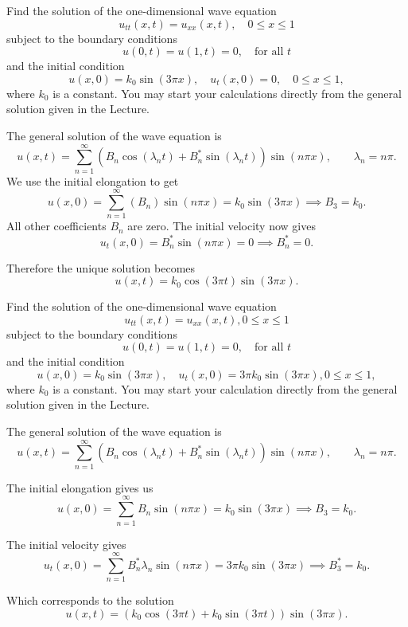 Find the solution of the one-dimensional wave equation
\[ 
u_{tt} (x,t) = u_{x x} (x,t), \quad 0 \leq x \leq 1
\]
subject to the boundary conditions
\[ 
u(0,t) = u(1,t) = 0, \quad \text{for all } t
\]
and the initial condition
\[ 
u(x,0) = k_0 \sin \left( 3 \pi x \right), \quad u_t(x,0) = 0, \quad 0 \leq x\leq 1,
\]
where $k_0$ is a constant.
You may start your calculations directly from the general solution given in the Lecture.

\hr

The general solution of the wave equation is
\[ 
u(x,t) = \sum_{n = 1}^{\infty} \left( B_n \cos \left( \lambda_n t \right) + B_n^{*} \sin \left( \lambda_n t \right) \right) \sin \left( n \pi x \right), \qquad \lambda_n = n \pi
.\]
We use the initial elongation to get
\[ 
u(x,0) = \sum_{n = 1}^{\infty} \left( B_n \right) \sin \left( n \pi x \right) = k_0 \sin (3 \pi x) \implies B_3 = k_0
.\]
All other coefficients $B_n$ are zero.
The initial velocity now gives
\[ 
u_t (x,0) = B_n^{*} \sin \left( n \pi x \right) = 0 \implies B_n^{*} = 0
.\]

Therefore the unique solution becomes
\[ 
  u (x,t) = k_0 \cos \left( 3 \pi t \right) \sin \left( 3 \pi x \right)
.\]


Find the solution of the one-dimensional wave equation
\[ 
u_{tt} (x,t) = u_{xx}(x,t), 0 \leq x \leq 1
\]
subject to the boundary conditions
\[ 
u(0,t) = u(1,t) = 0, \quad \text{for all } t
\]
and the initial condition
\[ 
u(x,0) = k_0 \sin \left( 3 \pi x \right), \quad u_t (x,0) = 3\pi k_0 \sin \left( 3 \pi x \right), 0 \leq x \leq 1,
\]
where $k_0$ is a constant.
You may start your calculation directly from the general solution given in the Lecture.

\hr

The general solution of the wave equation is
\[ 
u(x,t) = \sum_{n = 1}^{\infty} \left( B_n \cos \left( \lambda_n t \right) + B_n^{*} \sin \left( \lambda_n t \right) \right) \sin \left( n \pi x \right), \qquad \lambda_n = n \pi
.\]

The initial elongation gives us
\[ 
u (x,0) = \sum_{n = 1}^{\infty} B_n \sin (n \pi x) = k_0 \sin (3 \pi x) \implies B_3 = k_0
.\]

The initial velocity gives
\[ 
u_t(x,0) = \sum_{n = 1}^{\infty} B_n^{*}\lambda_n \sin (n \pi x) = 3 \pi k_0 \sin \left( 3 \pi x \right) \implies B_3^{*} = k_0
.\]

Which corresponds to the solution
\[ 
u(x,t) = \left( k_0 \cos \left( 3 \pi t \right) + k_0 \sin \left( 3 \pi t  \right) \right) \sin (3 \pi x)
.\]
